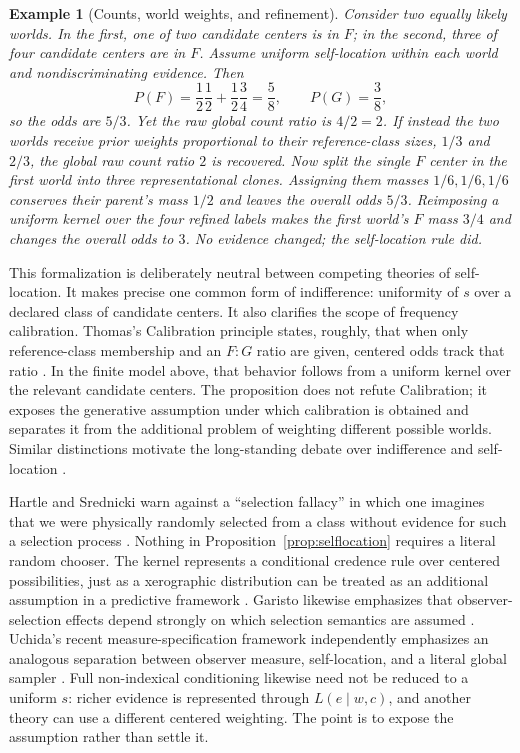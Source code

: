 \documentclass[11pt]{article}
\newtheorem{example}{Example}
\begin{document}
\begin{example}[Counts, world weights, and refinement]\label{ex:selflocation}
Consider two equally likely worlds. In the first, one of two candidate centers is in $F$; in the second, three of four candidate centers are in $F$. Assume uniform self-location within each world and nondiscriminating evidence. Then
\[
P(F)=\frac12\frac12+\frac12\frac34=\frac58,
\qquad
P(G)=\frac38,
\]
so the odds are $5/3$. Yet the raw global count ratio is $4/2=2$. If instead the two worlds receive prior weights proportional to their reference-class sizes, $1/3$ and $2/3$, the global raw count ratio $2$ is recovered. Now split the single $F$ center in the first world into three representational clones. Assigning them masses $1/6,1/6,1/6$ conserves their parent's mass $1/2$ and leaves the overall odds $5/3$. Reimposing a uniform kernel over the four refined labels makes the first world's $F$ mass $3/4$ and changes the overall odds to $3$. No evidence changed; the self-location rule did.
\end{example}

This formalization is deliberately neutral between competing theories of self-location. It makes precise one common form of indifference: uniformity of $s$ over a declared class of candidate centers. It also clarifies the scope of frequency calibration. Thomas's Calibration principle states, roughly, that when only reference-class membership and an $F:G$ ratio are given, centered odds track that ratio \citep{thomas2024}. In the finite model above, that behavior follows from a uniform kernel over the relevant candidate centers. The proposition does not refute Calibration; it exposes the generative assumption under which calibration is obtained and separates it from the additional problem of weighting different possible worlds. Similar distinctions motivate the long-standing debate over indifference and self-location \citep{elga2004,weatherson2003,bostrom2005,fallislewis2023}.

Hartle and Srednicki warn against a ``selection fallacy'' in which one imagines that we were physically randomly selected from a class without evidence for such a selection process \citep{hartlesrednicki2007}. Nothing in Proposition~\ref{prop:selflocation} requires a literal random chooser. The kernel represents a conditional credence rule over centered possibilities, just as a xerographic distribution can be treated as an additional assumption in a predictive framework \citep{srednickihartle2013}. Garisto likewise emphasizes that observer-selection effects depend strongly on which selection semantics are assumed \citep{garisto2020}. Uchida's recent measure-specification framework independently emphasizes an analogous separation between observer measure, self-location, and a literal global sampler \citep{uchida2026}. Full non-indexical conditioning likewise need not be reduced to a uniform $s$: richer evidence is represented through $L(e\mid w,c)$, and another theory can use a different centered weighting. The point is to expose the assumption rather than settle it.
\end{document}
